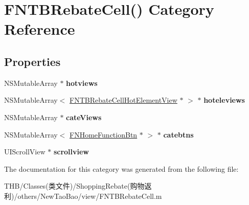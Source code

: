 \hypertarget{category_f_n_t_b_rebate_cell_07_08}{}\section{F\+N\+T\+B\+Rebate\+Cell() Category Reference}
\label{category_f_n_t_b_rebate_cell_07_08}
\subsection*{Properties}
\begin{DoxyCompactItemize}
\item 
\mbox{\label{category_f_n_t_b_rebate_cell_07_08_a57d032f2144fc7166a70d01767e8a577}} 
N\+S\+Mutable\+Array $\ast$ {\bfseries hotviews}
\item 
\mbox{\label{category_f_n_t_b_rebate_cell_07_08_a45ad48af3e0771ff8abdd572e510ed37}} 
N\+S\+Mutable\+Array$<$ \mbox{\hyperlink{interface_f_n_t_b_rebate_cell_hot_element_view}{F\+N\+T\+B\+Rebate\+Cell\+Hot\+Element\+View}} $\ast$ $>$ $\ast$ {\bfseries hoteleviews}
\item 
\mbox{\label{category_f_n_t_b_rebate_cell_07_08_a2ebf50c43f3b2ac062e7e61fe7c97af2}} 
N\+S\+Mutable\+Array $\ast$ {\bfseries cate\+Views}
\item 
\mbox{\label{category_f_n_t_b_rebate_cell_07_08_ab80850bf4c4900d5cc3460622cdb4d9c}} 
N\+S\+Mutable\+Array$<$ \mbox{\hyperlink{interface_f_n_home_function_btn}{F\+N\+Home\+Function\+Btn}} $\ast$ $>$ $\ast$ {\bfseries catebtns}
\item 
\mbox{\label{category_f_n_t_b_rebate_cell_07_08_ab01b398e5a4d0705c1676d301689719f}} 
U\+I\+Scroll\+View $\ast$ {\bfseries scrollview}
\end{DoxyCompactItemize}


The documentation for this category was generated from the following file\+:\begin{DoxyCompactItemize}
\item 
T\+H\+B/\+Classes(类文件)/\+Shopping\+Rebate(购物返利)/others/\+New\+Tao\+Bao/view/F\+N\+T\+B\+Rebate\+Cell.\+m\end{DoxyCompactItemize}
